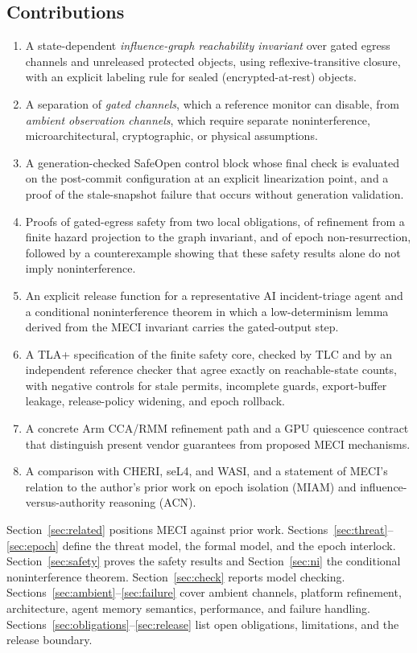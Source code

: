 \documentclass[11pt,letterpaper]{article}
\theoremstyle{plain}
\theoremstyle{definition}
\begin{document}
\subsection{Contributions}
\begin{enumerate}[leftmargin=*,itemsep=1pt]
\item A state-dependent \emph{influence-graph reachability invariant} over gated egress channels and unreleased protected objects, using reflexive-transitive closure, with an explicit labeling rule for sealed (encrypted-at-rest) objects.
\item A separation of \emph{gated channels}, which a reference monitor can disable, from \emph{ambient observation channels}, which require separate noninterference, microarchitectural, cryptographic, or physical assumptions.
\item A generation-checked SafeOpen control block whose final check is evaluated on the post-commit configuration at an explicit linearization point, and a proof of the stale-snapshot failure that occurs without generation validation.
\item Proofs of gated-egress safety from two local obligations, of refinement from a finite hazard projection to the graph invariant, and of epoch non-resurrection, followed by a counterexample showing that these safety results alone do not imply noninterference.
\item An explicit release function for a representative AI incident-triage agent and a conditional noninterference theorem in which a low-determinism lemma derived from the MECI invariant carries the gated-output step.
\item A TLA+ specification of the finite safety core, checked by TLC and by an independent reference checker that agree exactly on reachable-state counts, with negative controls for stale permits, incomplete guards, export-buffer leakage, release-policy widening, and epoch rollback.
\item A concrete Arm CCA/RMM refinement path and a GPU quiescence contract that distinguish present vendor guarantees from proposed MECI mechanisms.
\item A comparison with CHERI, seL4, and WASI, and a statement of MECI's relation to the author's prior work on epoch isolation (MIAM) and influence-versus-authority reasoning (ACN).
\end{enumerate}

Section~\ref{sec:related} positions MECI against prior work. Sections~\ref{sec:threat}--\ref{sec:epoch} define the threat model, the formal model, and the epoch interlock. Section~\ref{sec:safety} proves the safety results and Section~\ref{sec:ni} the conditional noninterference theorem. Section~\ref{sec:check} reports model checking. Sections~\ref{sec:ambient}--\ref{sec:failure} cover ambient channels, platform refinement, architecture, agent memory semantics, performance, and failure handling. Sections~\ref{sec:obligations}--\ref{sec:release} list open obligations, limitations, and the release boundary.
\end{document}
